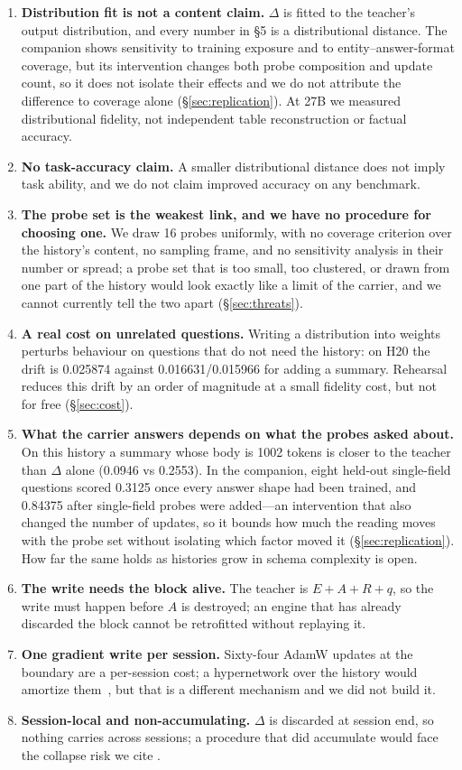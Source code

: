 \documentclass[sigconf,nonacm]{acmart}
\begin{document}
\begin{enumerate}[leftmargin=1.2em]
\item \textbf{Distribution fit is not a content claim.} $\Delta$ is fitted to the teacher's output distribution,
and every number in \S5 is a distributional distance. The companion shows sensitivity to training exposure and to
entity--answer-format coverage, but its intervention changes both probe composition and update count, so it does not
isolate their effects and we do not attribute the difference to coverage alone (\S\ref{sec:replication}). At 27B we
measured distributional fidelity, not independent table reconstruction or factual accuracy.
\item \textbf{No task-accuracy claim.} A smaller distributional distance does not imply task ability, and we do
not claim improved accuracy on any benchmark.
\item \textbf{The probe set is the weakest link, and we have no procedure for choosing one.} We draw 16 probes
uniformly, with no coverage criterion over the history's content, no sampling frame, and no sensitivity analysis
in their number or spread; a probe set that is too small, too clustered, or drawn from one part of the history
would look exactly like a limit of the carrier, and we cannot currently tell the two apart
(\S\ref{sec:threats}).
\item \textbf{A real cost on unrelated questions.} Writing a distribution into weights perturbs behaviour on
questions that do not need the history: on H20 the drift is 0.025874 against 0.016631/0.015966 for adding a
summary. Rehearsal reduces this drift by an order of magnitude at a small fidelity cost, but not for free
(\S\ref{sec:cost}).
\item \textbf{What the carrier answers depends on what the probes asked about.} On this history a summary whose body
is 1002 tokens is closer to the teacher than $\Delta$ alone (0.0946 vs 0.2553). In the companion, eight held-out
single-field questions scored 0.3125 once every answer shape had been trained, and 0.84375 after single-field
probes were added---an intervention that also changed the number of updates, so it bounds how much the reading
moves with the probe set without isolating which factor moved it (\S\ref{sec:replication}). How far the same holds
as histories grow in schema complexity is open.
\item \textbf{The write needs the block alive.} The teacher is $E{+}A{+}R{+}q$, so the write must happen before
$A$ is destroyed; an engine that has already discarded the block cannot be retrofitted without replaying it.
\item \textbf{One gradient write per session.} Sixty-four AdamW updates at the boundary are a per-session cost;
a hypernetwork over the history would amortize them~\cite{doctolora2026}, but that is a different mechanism and we did not build it.
\item \textbf{Session-local and non-accumulating.} $\Delta$ is discarded at session end, so nothing carries
across sessions; a procedure that did accumulate would face the collapse risk we cite
\cite{collapse2026,shumailov2024}.
\end{enumerate}
\end{document}
